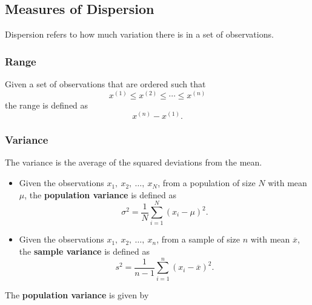 \documentclass{article}
\begin{document}
\subsection{Measures of Dispersion}
Dispersion refers to how much variation there is in a set of observations.
\subsubsection{Range}
Given a set of observations that are ordered such that
\begin{equation*}
    x^{\left( 1 \right)} \leq x^{\left( 2 \right)} \leq \cdots \leq x^{\left( n \right)}
\end{equation*}
the range is defined as
\begin{equation*}
    x^{\left( n \right)} - x^{\left( 1 \right)}.
\end{equation*}
\subsubsection{Variance}
The variance is the average of the squared deviations from the mean.
\begin{itemize}
    \item Given the observations \(x_1,\: x_2,\: \ldots,\: x_N\), from a population of size \(N\) with mean \(\mu\),
          the \textbf{population variance} is defined as
          \begin{equation*}
              \sigma^2 = \frac{1}{N} \sum_{i = 1}^N (x_i - \mu)^2.
          \end{equation*}
    \item Given the observations \(x_1,\: x_2,\: \ldots,\: x_n\), from a sample of size \(n\) with mean \(\overline{x}\),
          the \textbf{sample variance} is defined as
          \begin{equation*}
              s^2 = \frac{1}{n - 1} \sum_{i = 1}^n (x_i - \overline{x})^2.
          \end{equation*}
\end{itemize}
The \textbf{population variance} is given by
\end{document}
